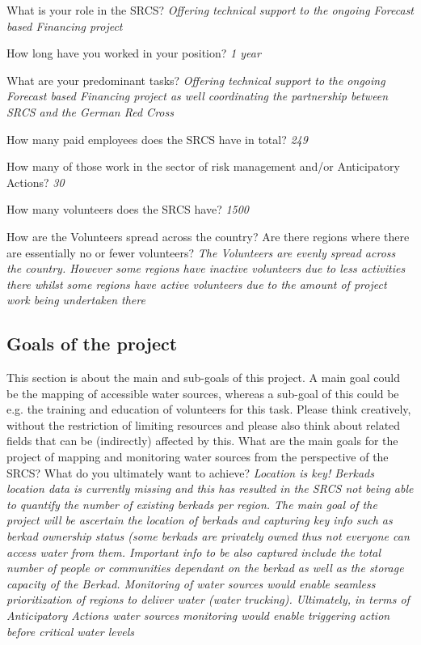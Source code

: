 What is your role in the SRCS?\newline
\textit{Offering technical support to the ongoing Forecast based Financing project}

How long have you worked in your position?\newline
\textit{1 year}

What are your predominant tasks?\newline
\textit{Offering technical support to the ongoing Forecast based Financing project as well coordinating the partnership between SRCS and the German Red Cross}

How many paid employees does the SRCS have in total?\newline
\textit{249}

How many of those work in the sector of risk management and/or Anticipatory Actions?\newline
\textit{30}

How many volunteers does the SRCS have?\newline
\textit{1500}

How are the Volunteers spread across the country? Are there regions where there are essentially no or fewer volunteers?\newline
\textit{The Volunteers are evenly spread across the country. However some regions have inactive volunteers due to less activities there whilst some regions have active volunteers due to the amount of project work being undertaken there
}

\subsection*{Goals of the project}

This section is about the main and sub-goals of this project. A main goal could be the mapping of accessible water sources, whereas a sub-goal of this could be e.g. the training and education of volunteers for this task. Please think creatively, without the restriction of limiting resources and please also think about related fields that can be (indirectly) affected by this.\newline
What are the main goals for the project of mapping and monitoring water sources from the perspective of the SRCS? What do you ultimately want to achieve?\newline
\textit{Location is key! Berkads location data is currently missing and this has resulted in the SRCS not being able to quantify the number of existing berkads per region. The main goal of the project will be ascertain the location of berkads and capturing key info such as berkad ownership status (some berkads are privately owned thus not everyone can access water from them. Important info to be also captured include the total number of people or communities dependant on the berkad as well as the storage capacity of the Berkad. Monitoring of water sources would enable seamless prioritization of regions to deliver water (water trucking). Ultimately, in terms of Anticipatory Actions water sources monitoring would enable triggering action before critical water levels}


